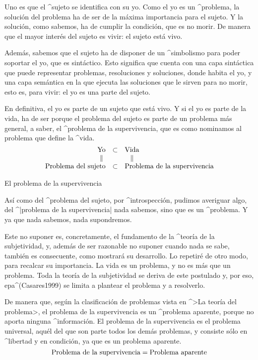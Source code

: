 Uno es que el ^{sujeto} se identifica con su yo. Como el yo es un
^{problema}, la solución del problema ha de ser de la máxima importancia
para el sujeto. Y la solución, como sabemos, ha de cumplir la condición,
que es no morir. De manera que el mayor interés del sujeto es vivir: el
sujeto está vivo.

Además, sabemos que el sujeto ha de disponer de un ^{simbolismo} para
poder soportar el yo, que es sintáctico. Esto significa que cuenta con
una capa sintáctica que puede representar problemas, resoluciones y
soluciones, donde habita el yo, y una capa semántica en la que ejecuta
las soluciones que le sirven para no morir, esto es, para vivir: el yo
es una parte del sujeto.

En definitiva, el yo es parte de un sujeto que está vivo. Y si el yo es
parte de la vida, ha de ser porque el problema del sujeto es parte de un
problema más general, a saber, el ^{problema de la supervivencia}, que
es como nominamos al problema que define la ^{vida}.
$$\vbox{\halign{\hfil#&\quad\hfil#\hfil\quad&#\hfil\cr
 \vtop{\halign{\hfil#\hfil\cr Yo\cr $\parallel$\cr}}& %
 $\subset$&
 \vtop{\halign{\hfil#\hfil\cr Vida\cr $\parallel$\cr}}\cr
 \strut Problema del sujeto&
 $\subset$&
 Problema de la supervivencia\cr}}$$


\Section El problema de la supervivencia

Así como del ^{problema del sujeto}, por ^{introspección}, pudimos
averiguar algo, del ^|problema de la supervivencia| nada sabemos, sino
que es un ^{problema}. Y ya que nada sabemos, nada supondremos.

Este no suponer es, concretamente, el fundamento de la ^{teoría de la
subjetividad}, y, además de ser razonable no suponer cuando nada se
sabe, también es consecuente, como mostrará su desarrollo. Lo repetiré
de otro modo, para recalcar su importancia. La vida es un problema, y no
es más que un problema. Toda la teoría de la subjetividad se deriva de
este postulado y, por eso, {\sc epa}^(Casares1999) se limita a plantear
el problema y a resolverlo.

De manera que, según la clasificación de problemas vista en ^>La teoría
del problema>, el problema de la supervivencia es un ^{problema
aparente}, porque no aporta ninguna ^{información}. El problema de la
supervivencia es el problema universal, aquél del que son parte todos
los demás problemas, y consiste sólo en ^{libertad} y en condición, ya
que es un problema aparente.
$$\hbox{Problema de la supervivencia} = \hbox{Problema aparente}$$

